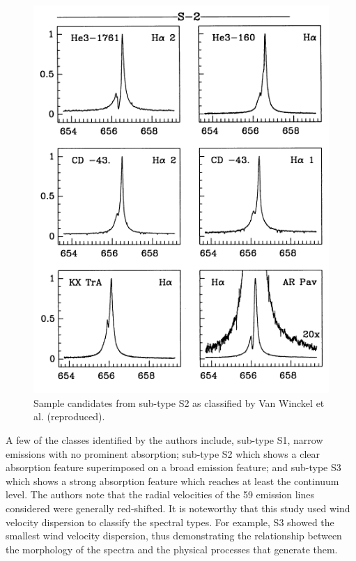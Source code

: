 \begin{figure}[!htb]
\centering
\includegraphics[scale=0.75]{figures/van.png}
\caption{Sample candidates from sub-type S2 as classified by Van Winckel et al. (reproduced).}
\end{figure}

A few of the classes identified by the authors include, sub-type S1, narrow emissions with no prominent absorption; sub-type S2 which shows a clear absorption feature superimposed on a broad emission feature; and sub-type S3 which shows a strong absorption feature which reaches at least the continuum level. The authors note that the radial velocities of the 59 emission lines considered were generally red-shifted. It is noteworthy that this study used wind velocity dispersion to classify the spectral types. For example, S3 showed the smallest wind velocity dispersion, thus demonstrating the relationship between the morphology of the spectra and the physical processes that generate them.

